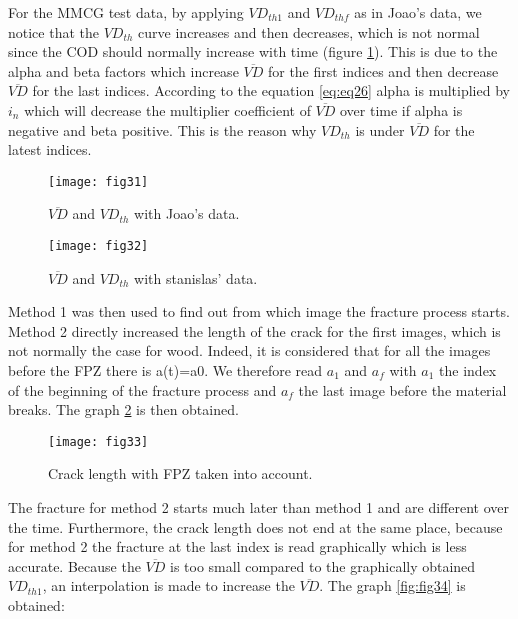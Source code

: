 For the MMCG test data, by applying $VD_{th1}$ and $VD_{thf}$ as in Joao's data, we notice that the $VD_{th}$ curve increases and then decreases, which is not normal since the COD should normally increase with time (figure \ref{fig:fig32}). This is due to the alpha and beta factors which increase $\overline{VD}$ for the first indices and then decrease $\overline{VD}$ for the last indices. According to the equation \ref{eq:eq26} alpha is multiplied by $i_n$ which will decrease the multiplier coefficient of $\overline{VD}$ over time if alpha is negative and beta positive. This is the reason why $VD_{th}$ is under $\overline{VD}$  for the latest indices.

\begin{figure}[htp]
	\begin{minipage}[c]{.46\linewidth}
		\centering
		\texttt{[image: fig31]}
		\caption{$\overline{VD}$ and $VD_{th}$ with Joao's data.}
		\label{fig:fig31}
	\end{minipage}
	\hfill%
	\begin{minipage}[c]{.46\linewidth}
		\centering
		\texttt{[image: fig32]}
		\caption{$\overline{VD}$ and $VD_{th}$ with stanislas' data.}
		\label{fig:fig32}
	\end{minipage}
\end{figure}


Method 1 was then used to find out from which image the fracture process starts. Method 2 directly increased the length of the crack for the first images, which is not normally the case for wood.  Indeed, it is considered that for all the images before the FPZ there is a(t)=a0. We therefore read $a_1$ and $a_f$ with $a_1$ the index of the beginning of the fracture process and $a_f$ the last image before the material breaks. The graph \ref{fig:fig33} is then obtained.


\begin{figure}[htp]
	\centering
	\texttt{[image: fig33]}
	\caption{Crack length with FPZ taken into account.}
	\label{fig:fig33}
\end{figure}

The fracture for method 2 starts much later than method 1 and are different over the time. Furthermore, the crack length does not end at the same place, because for method 2 the fracture at the last index is read graphically which is less accurate.
Because the $\overline{VD}$ is too small compared to the graphically obtained $VD_{th1}$, an interpolation is made to increase the $\overline{VD}$. The graph \ref{fig:fig34} is obtained:


